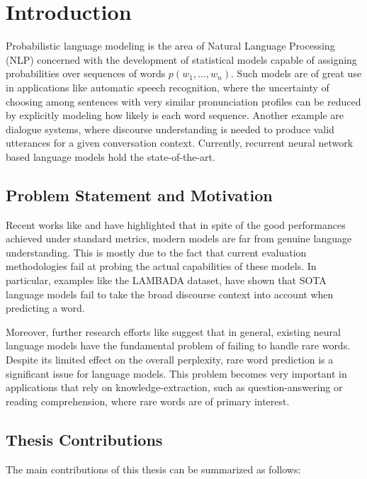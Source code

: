 \chapter{Introduction}

Probabilistic language modeling is the area of Natural Language Processing (NLP) concerned with the development of statistical models capable of assigning probabilities over sequences of words $p(w_1, \ldots ,w_n)$. Such models are of great use in applications like automatic speech recognition, where the uncertainty of choosing among sentences with very similar pronunciation profiles can be reduced by explicitly modeling how likely is each word sequence. Another example are dialogue systems, where discourse understanding is needed to produce valid utterances for a given conversation context. Currently, recurrent neural network based language models hold the state-of-the-art.

\section{Problem Statement and Motivation}
\label{sec:motivation} 

Recent works like \cite{paperno2016lambada} and \cite{jia2017adversarial} have highlighted that in spite of the good performances achieved under standard metrics, modern models are far from genuine language understanding. This is mostly due to the fact that current evaluation methodologies fail at probing the actual capabilities of these models. In particular, examples like the LAMBADA dataset, have shown that SOTA language models fail to take the broad discourse context into account when predicting a word.

Moreover, further research efforts like \cite{merity2016pointer} suggest that in general, existing neural language models have the fundamental problem of failing to handle rare words. Despite its limited effect on the overall perplexity, rare word prediction is a significant issue for language models. This problem becomes very important in applications that rely on knowledge-extraction, such as question-answering or reading comprehension, where rare words are of primary interest.

\section{Thesis Contributions}
\label{sec:contribution}

The main contributions of this thesis can be summarized as follows:

